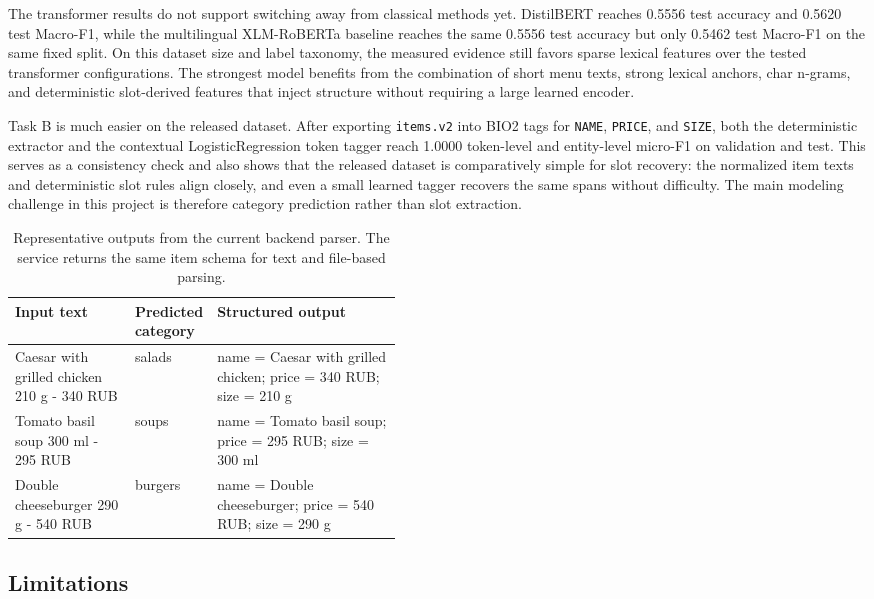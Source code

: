 \documentclass{article}
\begin{document}
The transformer results do not support switching away from classical methods
yet. DistilBERT reaches 0.5556 test accuracy and 0.5620 test Macro-F1, while
the multilingual XLM-RoBERTa baseline reaches the same 0.5556 test accuracy
but only 0.5462 test Macro-F1 on the same fixed split. On this dataset size
and label taxonomy, the measured evidence still favors sparse lexical features
over the tested transformer configurations. The strongest model benefits from
the combination of short menu texts, strong lexical anchors, char n-grams, and
deterministic slot-derived features that inject structure without requiring a
large learned encoder.

Task B is much easier on the released dataset. After exporting
\texttt{items.v2} into BIO2 tags for \texttt{NAME}, \texttt{PRICE}, and
\texttt{SIZE}, both the deterministic extractor and the contextual
LogisticRegression token tagger reach 1.0000 token-level and entity-level
micro-F1 on validation and test. This serves as a consistency check and also
shows that the released dataset is comparatively simple for slot recovery:
the normalized item texts and deterministic slot rules align closely, and even
a small learned tagger recovers the same spans without difficulty. The main
modeling challenge in this project is therefore category prediction rather
than slot extraction.

\begin{table}[t]
\centering
\small
\begin{tabularx}{\linewidth}{p{0.31\linewidth}p{0.14\linewidth}X}
\toprule
Input text & Predicted category & Structured output \\
\midrule
Caesar with grilled chicken 210 g - 340 RUB & salads & name = Caesar with grilled chicken; price = 340 RUB; size = 210 g \\
Tomato basil soup 300 ml - 295 RUB & soups & name = Tomato basil soup; price = 295 RUB; size = 300 ml \\
Double cheeseburger 290 g - 540 RUB & burgers & name = Double cheeseburger; price = 540 RUB; size = 290 g \\
\bottomrule
\end{tabularx}
\caption{Representative outputs from the current backend parser. The service returns the same item schema for text and file-based parsing.}
\label{tab:output-samples}
\end{table}

\subsection{Limitations}
\end{document}
